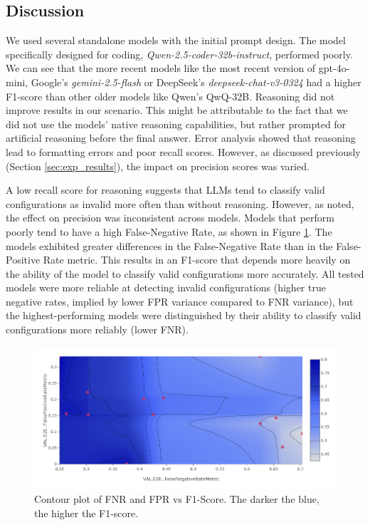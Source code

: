 \subsection{Discussion} \label{sec:exp_discussion}

We used several standalone models with the initial prompt design. The model specifically designed for coding, \textit{Qwen-2.5-coder-32b-instruct}, performed poorly. We can see that the more recent models like the most recent version of gpt-4o-mini, Google's \textit{gemini-2.5-flash} or DeepSeek's \textit{deepseek-chat-v3-0324} had a higher F1-score than other older models like Qwen's QwQ-32B. Reasoning did not improve results in our scenario. This might be attributable to the fact that we did not use the models' native reasoning capabilities, but rather prompted for artificial reasoning before the final answer. Error analysis showed that reasoning lead to formatting errors and poor recall scores. However, as discussed previously (Section \ref{sec:exp_results}), the impact on precision scores was varied.

A low recall score for reasoning suggests that LLMs tend to classify valid configurations as invalid more often than without reasoning. However, as noted, the effect on precision was inconsistent across models. Models that perform poorly tend to have a high False-Negative Rate, as shown in Figure \ref{fig:fnrfpr}. The models exhibited greater differences in the False-Negative Rate than in the False-Positive Rate metric. This results in an F1-score that depends more heavily on the ability of the model to classify valid configurations more accurately. All tested models were more reliable at detecting invalid configurations (higher true negative rates, implied by lower FPR variance compared to FNR variance), but the highest-performing models were distinguished by their ability to classify valid configurations more reliably (lower FNR).

\begin{figure}[!ht]
    \centering
    \includegraphics[width=\textwidth]{images/FNR-FPR-F1.png}
    \caption{Contour plot of FNR and FPR vs F1-Score. The darker the blue, the higher the F1-score.}
    \label{fig:fnrfpr}
\end{figure}

